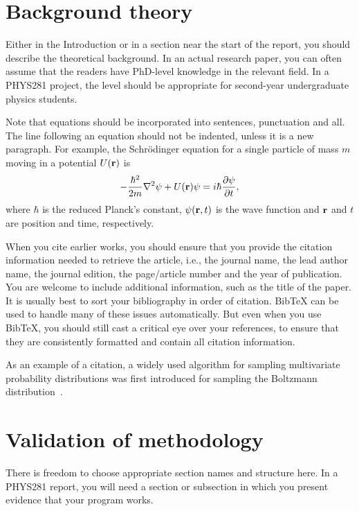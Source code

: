 \documentclass[a4,12pt]{article}
\begin{document}
\section{Background theory}

Either in the Introduction or in a section near the start of the
report, you should describe the theoretical background.  In an actual
research paper, you can often assume that the readers have PhD-level
knowledge in the relevant field.  In a PHYS281 project, the level
should be appropriate for second-year undergraduate physics students.

Note that equations should be incorporated into sentences, punctuation
and all.  The line following an equation should not be indented,
unless it is a new paragraph.  For example, the Schr\"{o}dinger
equation for a single particle of mass $m$ moving in a potential
$U({\bf r})$ is
\begin{equation} -\frac{\hbar^2}{2m} \nabla^2 \psi + U({\bf r})\psi
= i\hbar \frac{\partial \psi}{\partial
  t}, \label{eq:schrodinger} \end{equation} where $\hbar$ is the
reduced Planck's constant, $\psi({\bf r},t)$ is the wave function and
${\bf r}$ and $t$ are position and time, respectively.

When you cite earlier works, you should ensure that you provide the
citation information needed to retrieve the article, i.e., the journal
name, the lead author name, the journal edition, the page/article
number and the year of publication.  You are welcome to include
additional information, such as the title of the paper.  It is usually
best to sort your bibliography in order of citation.  BibTeX can be
used to handle many of these issues automatically.  But even when you
use BibTeX, you should still cast a critical eye over your references,
to ensure that they are consistently formatted and contain all
citation information.

As an example of a citation, a widely used algorithm for sampling
multivariate probability distributions was first introduced for
sampling the Boltzmann distribution~\cite{Metropolis}.

\section{Validation of methodology~\label{sec:validation}}

There is freedom to choose appropriate section names and structure
here.  In a PHYS281 report, you will need a section or subsection in
which you present evidence that your program works.
\end{document}
